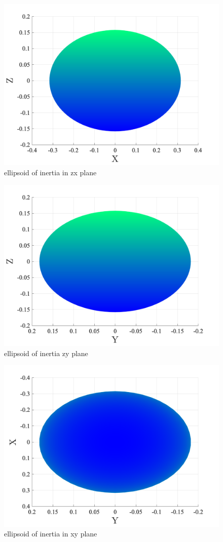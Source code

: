 \begin{figure}[H]
    \caption{ellipsoid of inertia in zx plane}
    \centering
    \includegraphics[width=12cm]{../Figure/Q1/xz_view_elipsoid_inertia}
\end{figure}

\begin{figure}[H]
    \caption{ellipsoid of inertia zy plane}
    \centering
    \includegraphics[width=12cm]{../Figure/Q1/yz_view_elipsoid_inertia}
\end{figure}

\begin{figure}[H]
    \caption{ellipsoid of inertia in xy plane}
    \centering
    \includegraphics[width=12cm]{../Figure/Q1/xy_view_elipsoid_inertia}
\end{figure}

